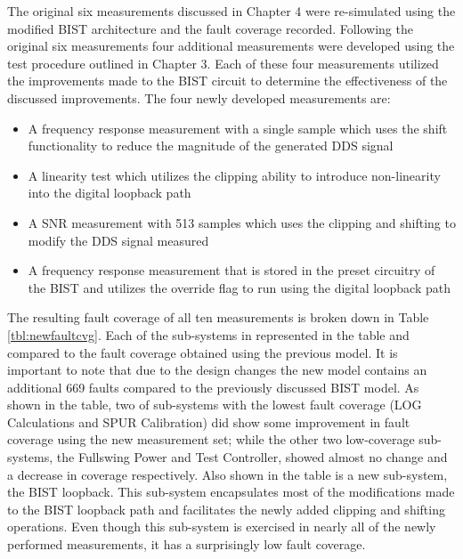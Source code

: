 \documentclass[12pt]{report}
\begin{document}
The original six measurements discussed in Chapter 4 were re-simulated using the modified BIST architecture and the fault coverage recorded.  Following the original six measurements four additional measurements were developed using the test procedure outlined in Chapter 3.  Each of these four measurements utilized the improvements made to the BIST circuit to determine the effectiveness of the discussed improvements.  The four newly developed measurements are:
\begin{itemize}
  \item A frequency response measurement with a single sample which uses the shift functionality to reduce the magnitude of the generated DDS signal
  \item A linearity test which utilizes the clipping ability to introduce non-linearity into the digital loopback path
  \item A SNR measurement with 513 samples which uses the clipping and shifting to modify the DDS signal measured
  \item A frequency response measurement that is stored in the preset circuitry of the BIST and utilizes the override flag to run using the digital loopback path
\end{itemize}

The resulting fault coverage of all ten measurements is broken down in Table \ref{tbl:newfaultcvg}.  Each of the sub-systems in represented in the table and compared to the fault coverage obtained using the previous model.  It is important to note that due to the design changes the new model contains an additional 669 faults compared to the previously discussed BIST model.  As shown in the table, two of sub-systems with the lowest fault coverage (LOG Calculations and SPUR Calibration) did show some improvement in fault coverage using the new measurement set; while the other two low-coverage sub-systems, the Fullswing Power and Test Controller, showed almost no change and a decrease in coverage respectively.  Also shown in the table is a new sub-system, the BIST loopback.  This sub-system encapsulates most of the modifications made to the BIST loopback path and facilitates the newly added clipping and shifting operations.  Even though this sub-system is exercised in nearly all of the newly performed measurements, it has a surprisingly low fault coverage.
\end{document}
